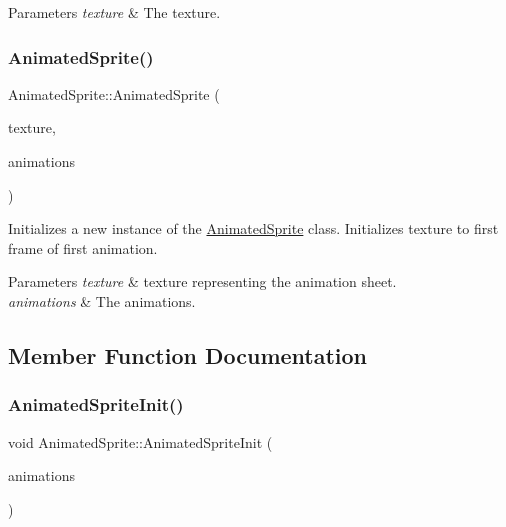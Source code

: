 \begin{DoxyParams}{Parameters}
{\em texture} & The texture.\\
\hline
\end{DoxyParams}
\mbox{\label{class_animated_sprite_ac17be6b9808193a6bcbdccd92b61e60e}} 
\subsubsection{\texorpdfstring{Animated\+Sprite()}{AnimatedSprite()}\hspace{0.1cm}{\footnotesize\ttfamily [3/3]}}
{\footnotesize\ttfamily Animated\+Sprite\+::\+Animated\+Sprite (\begin{DoxyParamCaption}\item[{const sf\+::\+Texture \&}]{texture,  }\item[{\hyperlink{class_animation_set}{Animation\+Set} $\ast$}]{animations }\end{DoxyParamCaption})}



Initializes a new instance of the \hyperlink{class_animated_sprite}{Animated\+Sprite} class. Initializes texture to first frame of first animation. 


\begin{DoxyParams}{Parameters}
{\em texture} & texture representing the animation sheet.\\
\hline
{\em animations} & The animations.\\
\hline
\end{DoxyParams}


\subsection{Member Function Documentation}
\mbox{\label{class_animated_sprite_a003d5c113b53ad5cb6c9836fb7b6d7c0}} 
\subsubsection{\texorpdfstring{Animated\+Sprite\+Init()}{AnimatedSpriteInit()}}
{\footnotesize\ttfamily void Animated\+Sprite\+::\+Animated\+Sprite\+Init (\begin{DoxyParamCaption}\item[{\hyperlink{class_animation_set}{Animation\+Set} $\ast$}]{animations }\end{DoxyParamCaption})\hspace{0.3cm}{\ttfamily [protected]}}



